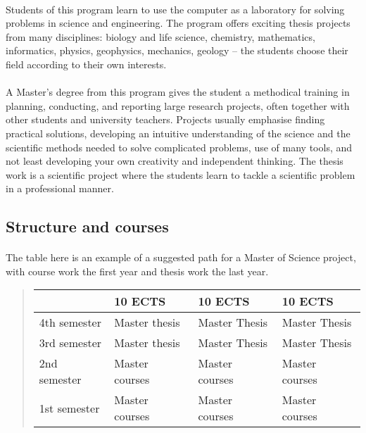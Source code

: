 \documentclass[%
twoside,                 %
final,                   %
10pt]{article}
\begin{document}
\paragraph{}
Students of this program learn to use the computer as a laboratory for solving problems in science and engineering. The program offers exciting thesis projects from many disciplines: biology and life science, chemistry, mathematics, informatics, physics, geophysics, mechanics, geology  – the students choose their  field according to their own interests.




\paragraph{}
A Master’s degree from this program gives the student  a
methodical training in planning, conducting, and reporting large research
projects, often together with other students and university
teachers. Projects usually emphasise finding practical solutions,
developing an intuitive understanding of the science and the
scientific methods needed to solve complicated problems, use of many
tools, and not least developing your own creativity and independent
thinking. The thesis work is a scientific project where the students learn to
tackle a scientific problem in a professional manner.






\subsection*{Structure and courses}

\paragraph{}
The table here is an example of a suggested path for a Master of Science project,
with course work the first year and thesis work the last year.


\begin{quote}
\begin{tabular}{llll}
\hline
\multicolumn{1}{l}{  } & \multicolumn{1}{l}{ 10 ECTS } & \multicolumn{1}{l}{ 10 ECTS } & \multicolumn{1}{l}{ 10 ECTS } \\
\hline
4th semester & Master thesis  & Master Thesis  & Master Thesis  \\
\hline
3rd semester & Master thesis  & Master Thesis  & Master Thesis  \\
\hline
2nd semester & Master courses & Master courses & Master courses \\
\hline
1st semester & Master courses & Master courses & Master courses \\
\hline
\end{tabular}
\end{quote}
\end{document}
